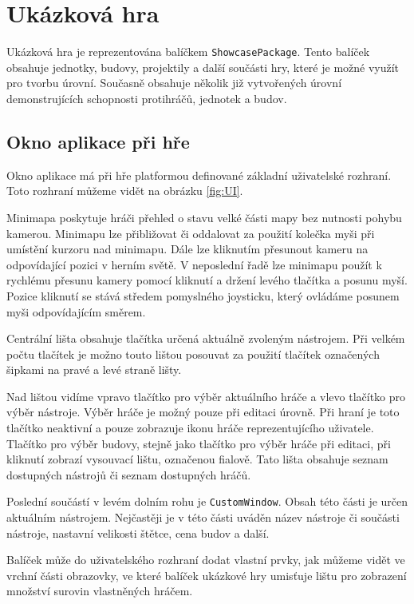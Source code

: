 \section{Ukázková hra}
Ukázková hra je reprezentována balíčkem \texttt{ShowcasePackage}. Tento balíček obsahuje jednotky, budovy, projektily a další součásti hry, které je možné využít pro tvorbu úrovní. Současně obsahuje několik již vytvořených úrovní demonstrujících schopnosti protihráčů, jednotek a budov.

\subsection{Okno aplikace při hře}
\label{sec:appwindow}
Okno aplikace má při hře platformou definované základní uživatelské rozhraní. Toto rozhraní můžeme vidět na obrázku \ref{fig:UI}. 

Minimapa poskytuje hráči přehled o stavu velké části mapy bez nutnosti pohybu kamerou. Minimapu lze přibližovat či oddalovat za použití kolečka myši při umístění kurzoru nad minimapu. Dále lze kliknutím přesunout kameru na odpovídající pozici v herním světě. V neposlední řadě lze minimapu použít k rychlému přesunu kamery pomocí kliknutí a držení levého tlačítka a posunu myší. Pozice kliknutí se stává středem pomyslného joysticku, který ovládáme posunem myši odpovídajícím směrem.

Centrální lišta obsahuje tlačítka určená aktuálně zvoleným nástrojem. Při velkém počtu tlačítek je možno touto lištou posouvat za použití tlačítek označených šipkami na pravé a levé straně lišty.

Nad lištou vidíme vpravo tlačítko pro výběr aktuálního hráče a vlevo tlačítko pro výběr nástroje. Výběr hráče je možný pouze při editaci úrovně. Při hraní je toto tlačítko neaktivní a pouze zobrazuje ikonu hráče reprezentujícího uživatele. Tlačítko pro výběr budovy, stejně jako tlačítko pro výběr hráče při editaci, při kliknutí zobrazí vysouvací lištu, označenou fialově. Tato lišta obsahuje seznam dostupných nástrojů či seznam dostupných hráčů.

Poslední součástí v levém dolním rohu je \texttt{CustomWindow}. Obsah této části je určen aktuálním nástrojem. Nejčastěji je v této části uváděn název nástroje či součásti nástroje, nastavní velikosti štětce, cena budov a další.

Balíček může do uživatelského rozhraní dodat vlastní prvky, jak můžeme vidět ve vrchní části obrazovky, ve které balíček ukázkové hry umisťuje lištu pro zobrazení množství surovin vlastněných hráčem.

